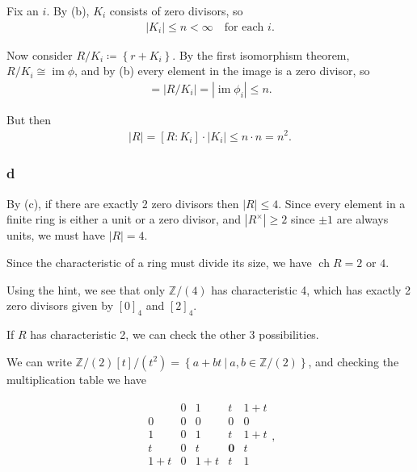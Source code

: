 \begin{solution}
Fix an \(i\). By (b), \(K_i\) consists of zero divisors, so
\begin{align*}
{\left\lvert {K_i} \right\rvert} \leq n < \infty \quad \text{for each } i
.\end{align*}

Now consider \(R/K_i \coloneqq\left\{{r + K_i}\right\}\). By the first
isomorphism theorem, \(R/K_i \cong \operatorname{im}\phi\), and by (b)
every element in the image is a zero divisor, so
\begin{align*}
[R: K_i] = {\left\lvert {R/K_i} \right\rvert} = {\left\lvert {\operatorname{im}\phi_i} \right\rvert} \leq n 
.\end{align*}

But then
\begin{align*}
{\left\lvert {R} \right\rvert} = [R:K_i]\cdot {\left\lvert {K_i} \right\rvert} \leq n\cdot n = n^2 
.\end{align*}

\hypertarget{d-8}{%
\subsubsection{d}\label{d-8}}

By (c), if there are exactly 2 zero divisors then
\({\left\lvert {R} \right\rvert} \leq 4\). Since every element in a
finite ring is either a unit or a zero divisor, and
\({\left\lvert {R^{\times}} \right\rvert} \geq 2\) since \(\pm 1\) are
always units, we must have \({\left\lvert {R} \right\rvert} = 4\).

Since the characteristic of a ring must divide its size, we have
\(\operatorname{ch}R = 2\) or \(4\).

Using the hint, we see that only \({\mathbb{Z}}/(4)\) has characteristic
4, which has exactly 2 zero divisors given by \([0]_4\) and \([2]_4\).

If \(R\) has characteristic 2, we can check the other 3 possibilities.

We can write
\({\mathbb{Z}}/(2)[t]/(t^2) = \left\{{a + bt {~\mathrel{\Big|}~}a,b\in {\mathbb{Z}}/(2)}\right\}\),
and checking the multiplication table we have

\begin{align*}
\begin{array}{c|cccc}
            & 0 & 1     & t & 1+t   \\ \hline
0       & 0 & 0     & 0 & 0     \\ 
1       & 0 & 1     & t & 1+t   \\ 
t       & 0 & t     & \mathbf{0} & t    \\ 
1 + t & 0 & 1+t & t & 1     \\ 
\end{array}
,\end{align*}


\end{solution}
